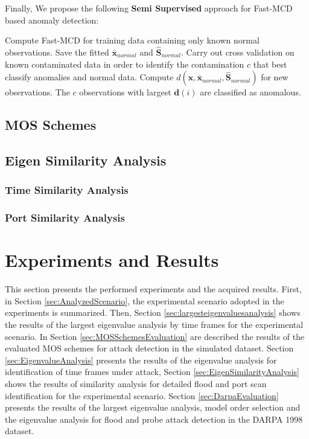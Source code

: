 \documentclass[review]{elsarticle}
\begin{document}
Finally, We propose the following \textbf{Semi Supervised} approach for Fast-MCD based anomaly detection:

Compute Fast-MCD for training data containing only known normal observations.
Save the fitted $\boldsymbol{\bar{x}}_{normal}$ and $\boldsymbol{\hat{S}}_{normal}$.
Carry out cross validation on known contaminated data in order to identify the contamination $c$ that best classify anomalies and normal data.
Compute $d(\boldsymbol{x},\bar{\boldsymbol{x}}_{normal}, \boldsymbol{\hat{S}}_{normal})$ for new observations.
The $c$ observations with largest $\boldsymbol{d}(i)$ are classified as anomalous.


\subsection{MOS Schemes}
\label{sec:prop_MOSSchemes}

\subsection{Eigen Similarity Analysis}
\label{sec:prop_EigenSimilarityAnalysis}

\subsubsection{Time Similarity Analysis}
\label{sec:prop_TimeSimilarityAnalysis}

\subsubsection{Port Similarity Analysis}
\label{sec:prop_PortSimilarityAnalysis}

\section{Experiments and Results}
\label{sec:experimentalresults}

This section presents the performed experiments and the acquired results. First, in Section \ref{sec:AnalyzedScenario}, the experimental scenario adopted in the experiments is summarized. Then, Section \ref{sec:largesteigenvaluesanalysis} shows the results of the largest eigenvalue analysis by time frames for the experimental scenario. In Section \ref{sec:MOSSchemesEvaluation} are described the results of the evaluated MOS schemes for attack detection in the simulated dataset. Section \ref{sec:EigenvalueAnalysis} presents the results of the eigenvalue analysis for identification of time frames under attack, Section \ref{sec:EigenSimilarityAnalysis} shows the results of similarity analysis for detailed flood and port scan identification for the experimental scenario. Section \ref{sec:DarpaEvaluation} presents the results of the largest eigenvalue analysis, model order selection and the eigenvalue analysis for flood and probe attack detection in the DARPA 1998 dataset.
\end{document}
